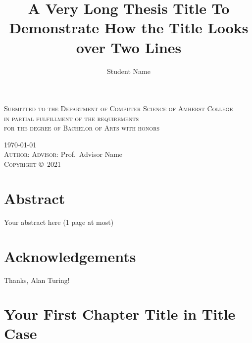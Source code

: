\documentclass[11pt,twoside,openright]{report}
\author{Student Name}
\title{A Very Long Thesis Title To Demonstrate How the Title Looks over Two Lines}
\newcommand{\graduationyear}{2021} %
\newcommand{\advisor}{Advisor Name} %
\begin{document}


\begin{titlepage}
  \centering
  {\LARGE\makeatletter\textbf{\MakeUppercase\@title}\makeatother}\par
  \vspace{0.6\baselineskip}
  {\scshape Submitted to the Department of Computer Science of Amherst
    College\\[0.5\baselineskip]
    in partial fulfillment of the requirements \\[0.5\baselineskip]
    for the degree of Bachelor of Arts with honors
  }\par
  \vspace{0.6\baselineskip}
  \textsc{\today}\\[1in] %
  \vspace{8\baselineskip}
  {\textsc{Author:} \makeatletter\@author\makeatother%
  \hfill\textsc{Advisor:} Prof.\ \advisor}\\[0.6\baselineskip]
  \vfill
  \textsc{Copyright} \copyright\ \textsc{\graduationyear}\ %
  {\scshape \makeatletter\@author\makeatother}
\end{titlepage}

\chapter*{Abstract} %

Your abstract here (1 page at most)

\chapter*{Acknowledgements} %

Thanks, Alan Turing!

\tableofcontents %
\clearpage %

\doublespacing%

\chapter{Your First Chapter Title in Title Case}

\lipsum%


\end{document}
